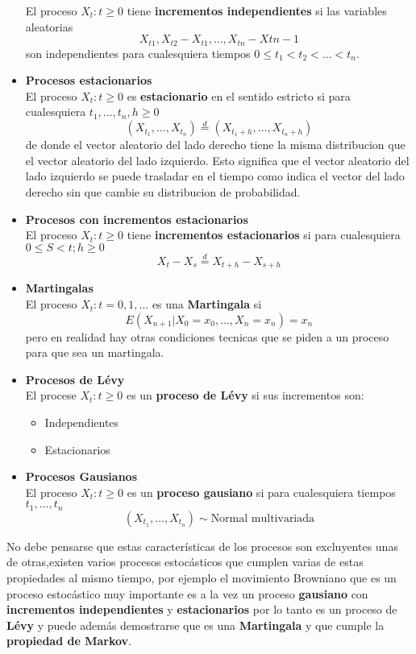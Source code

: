 \documentclass[10pt,a4paper]{article}
\theoremstyle{definition}
\theoremstyle{remark}
\begin{document}
\begin{multicols}{2}
\begin{itemize}
	El proceso $ {X_{t}: t \geq 0}$ tiene \textbf{incrementos independientes} si las 
	variables aleatorias $$X_{t1},X_{t2}-X_{t1},\dots, X_{tn}- X{tn-1}$$ son 
	independientes para cualesquiera tiempos  $0\leq t_{1}<t_{2}<\dots<t_{n}.$\\
	\item \textbf{Procesos estacionarios}\\
	El proceso ${X_{t}:t\geq0}$ es \textbf{estacionario} en el sentido estricto si para 
	cualesquiera $t_1,\dots,t_n,h \geq 0$
	$$(X_{t_1},\dots,X_{t_n})\stackrel{d}{=}(X_{t_1+h},\dots,X_{t_n+h})$$
	de donde el vector aleatorio del lado derecho tiene la misma distribucion que el 
	vector aleatorio del lado izquierdo. Esto significa que el vector aleatorio del lado 
	izquierdo se puede trasladar en el tiempo como indica el vector del lado derecho sin 
	que cambie su distribucion de probabilidad.\\
	\item \textbf{Procesos con incrementos estacionarios}\\
	El proceso ${X_t : t \geq 0}$ tiene \textbf{incrementos estacionarios} si para 
	cualesquiera $0\leq S < t; h \geq 0 $ $$X_t - X_s \stackrel{d}{=} X_{t+h} - X_{s+h} 
	$$
	\item \textbf{Martingalas} \\
	El proceso ${X_t : t = 0,1,\dots}$ es una \textbf{Martingala} si $$E(X_{n+1}|
	X_0=x_0,\dots,X_n=x_n)=x_n$$ pero en realidad hay otras condiciones tecnicas que se 
	piden a un proceso para que sea un martingala.\\
	\item \textbf{Procesos de Lévy} \\
	El procese ${X_t: t\geq0}$ es un \textbf{proceso de Lévy} si sus incrementos son:
	\begin{itemize}
		\item Independientes
		\item Estacionarios
	\end{itemize}
	\item \textbf{Procesos Gausianos}\\
	El proceso $X_t: t\geq 0$ es un \textbf{proceso gausiano} si para cualesquiera 
	tiempos $t_1,\dots,t_n$ 
	$$(X_{t_1},\dots,X_{t_n}) \sim \mbox{Normal multivariada}$$
\end{itemize}
\noindent No debe pensarse que estas características de los procesos son 
excluyentes unas de otras,existen varios procesos estocásticos que cumplen 
varias de estas propiedades al mismo tiempo, por ejemplo el movimiento Browniano que es un proceso estocástico muy importante es a la vez un proceso \textbf{gausiano} con \textbf{incrementos 
independientes} y \textbf{estacionarios} por lo tanto es un proceso de \textbf{Lévy} y 
puede además demostrarse que es una \textbf{Martingala} y que cumple la 
\textbf{propiedad de Markov}.\\


\end{multicols}
\end{document}

